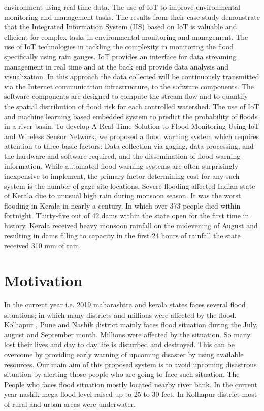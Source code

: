 \documentclass[a4paper,12pt]{report}
\begin{document}
\begin{itemize}
environment using real time data. The use of IoT to improve environmental monitoring and management tasks. The results from their case study demonstrate that the Integrated Information System (IIS) based on IoT is valuable and efficient for complex tasks in environmental monitoring and management. The use of IoT technologies in tackling the complexity in monitoring the flood specifically using rain gauges. IoT provides an interface for data streaming management in real time and at the back end provide data analysis and visualization. In this approach the data collected will be continuously transmitted via the Internet communication infrastructure, to the software components. The software components are designed to compute the stream flow and to quantify the spatial distribution of flood risk for each controlled watershed. The use of IoT and machine learning based embedded system to predict the probability of floods in a river basin. To develop A Real Time Solution to Flood Monitoring Using IoT and Wireless Sensor Network, we proposed a flood warning system which requires attention to three basic factors: Data collection via gaging, data processing, and the hardware and software required, and the dissemination of flood warning information. While automated flood warning systems are often surprisingly inexpensive to implement, the primary factor determining cost for any such system is the number of gage site locations. Severe flooding affected Indian state of Kerala due to unusual high rain during monsoon season. It was the worst flooding in Kerala in nearly a century. In which over 373 people died within fortnight. Thirty-five out of 42 dams within the state open for the first time in history. Kerala received heavy monsoon rainfall on the midevening of August and resulting in dams filling to capacity in the first 24 hours of rainfall the state received 310 mm of rain.
 

\section{Motivation}
In the current year i.e. 2019 maharashtra and kerala states faces several flood situations; in which many districts and millions were affected by the flood. Kolhapur , Pune and Nashik district mainly faces flood situation during the July, august and September month.    Millions were affected by the situation. So many lost their lives and day to day life is disturbed and destroyed.
This can be overcome by providing early warning of upcoming disaster by using available resources.   Our main aim of this proposed system is to avoid upcoming disastrous situation by alerting those people who are going to face such situation.
The People who faces flood situation mostly located nearby river bank. In the current year nashik mega flood level raised up to 25 to 30 feet. In Kolhapur district most of rural and urban areas were underwater.



\end{itemize}
\end{document}
